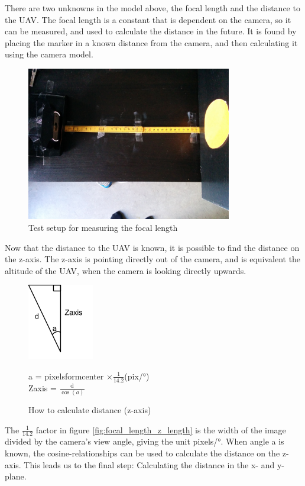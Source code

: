 There are two unknowns in the model above, the focal length and the distance to the UAV. The focal length is a constant that is dependent on the camera, so it can be measured, and used to calculate the distance in the future. It is found by placing the marker in a known distance from the camera, and then calculating it using the camera model.

\begin{figure}[h!]
	\centering
	\includegraphics[width=0.8\textwidth]{imgs/focal_length_test}
	\caption{Test setup for measuring the focal length}
\end{figure}

Now that the distance to the UAV is known, it is possible to find the distance on the z-axis. The z-axis is pointing directly out of the camera, and is equivalent the altitude of the UAV, when the camera is looking directly upwards. 

\begin{figure}[h!]
	\centering
	\includegraphics{imgs/focal_length_z_length}
	\caption{How to calculate distance (z-axis)}
	\label{fig:focal_length_z_length}
	a = pixelsformcenter $ \times \frac{1}{14.2}$(pix/\si{\degree})\\
	Zaxis = $\frac{\mathrm{d}}{\cos{(a)}}$
\end{figure}

The $\frac{1}{14.2}$ factor in figure \vref{fig:focal_length_z_length} is the width of the image divided by the camera's view angle, giving the unit pixels/\si{\degree}. When angle a is known, the cosine-relationships can be used to calculate the distance on the z-axis. This leads us to the final step: Calculating the distance in the x- and y-plane.
 
